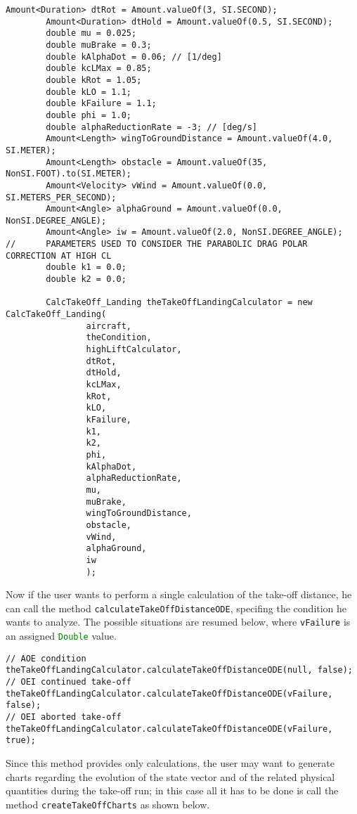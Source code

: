 \bigskip
\begin{lstlisting}[caption={Input data and \lstinline!CalcTakeOff_Landing! object creation }, captionpos=b, tabsize=2]
		Amount<Duration> dtRot = Amount.valueOf(3, SI.SECOND);
		Amount<Duration> dtHold = Amount.valueOf(0.5, SI.SECOND);
		double mu = 0.025;
		double muBrake = 0.3;
		double kAlphaDot = 0.06; // [1/deg]
		double kcLMax = 0.85;
		double kRot = 1.05;
		double kLO = 1.1;
		double kFailure = 1.1;
		double phi = 1.0;
		double alphaReductionRate = -3; // [deg/s]
		Amount<Length> wingToGroundDistance = Amount.valueOf(4.0, SI.METER);
		Amount<Length> obstacle = Amount.valueOf(35, NonSI.FOOT).to(SI.METER);
		Amount<Velocity> vWind = Amount.valueOf(0.0, SI.METERS_PER_SECOND);
		Amount<Angle> alphaGround = Amount.valueOf(0.0, NonSI.DEGREE_ANGLE);
		Amount<Angle> iw = Amount.valueOf(2.0, NonSI.DEGREE_ANGLE);
//		PARAMETERS USED TO CONSIDER THE PARABOLIC DRAG POLAR CORRECTION AT HIGH CL
		double k1 = 0.0;
		double k2 = 0.0;
	
		CalcTakeOff_Landing theTakeOffLandingCalculator = new CalcTakeOff_Landing(
				aircraft,
				theCondition,
				highLiftCalculator,
				dtRot,
				dtHold,
				kcLMax,
				kRot,
				kLO,
				kFailure,
				k1,
				k2,
				phi,
				kAlphaDot,
				alphaReductionRate,
				mu,
				muBrake,
				wingToGroundDistance,
				obstacle,
				vWind,
				alphaGround,
				iw
				);
\end{lstlisting}
%
Now if the user wants to perform a single calculation of the take-off distance, he can call the method \lstinline[language=Java]!calculateTakeOffDistanceODE!, specifing the condition he wants to analyze. The possible situations are resumed below, where \lstinline[language=Java]!vFailure! is an assigned \lstinline[language=Java]!Double! value.

\bigskip
\begin{lstlisting}[caption={Possible scenarios of calculation of the take-off distance}, captionpos=b, tabsize=2, label={lst:TakeOffScenarios}]
// AOE condition
theTakeOffLandingCalculator.calculateTakeOffDistanceODE(null, false); 
// OEI continued take-off
theTakeOffLandingCalculator.calculateTakeOffDistanceODE(vFailure, false); 
// OEI aborted take-off
theTakeOffLandingCalculator.calculateTakeOffDistanceODE(vFailure, true); 
\end{lstlisting}
%
Since this method provides only calculations, the user may want to generate charts regarding the evolution of the state vector and of the related physical quantities during the take-off run; in this case all it has to be done is call the method \lstinline[language=Java]!createTakeOffCharts! as shown below.

